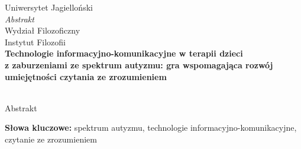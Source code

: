 \thispagestyle{firststyle}
{\centering\large
    \vspace{0.5cm}
    Uniwersytet Jagielloński\\
    {\Huge\emph{Abstrakt}\\}
    \vspace{0.5cm}
    Wydział Filozoficzny\\Instytut Filozofii\\
    \vspace{1cm}
    \textbf{Technologie informacyjno-komunikacyjne w terapii dzieci\\z zaburzeniami ze spektrum autyzmu: gra wspomagająca rozwój umiejętności czytania ze zrozumieniem\\}
    \vspace{0.5cm}
    \authorname\\
    \vspace{0.5cm}
}

Abstrakt

\vspace{1cm}
\noindent\textbf{Słowa kluczowe:}
spektrum autyzmu, technologie informacyjno-komunikacyjne, czytanie ze zrozumieniem

